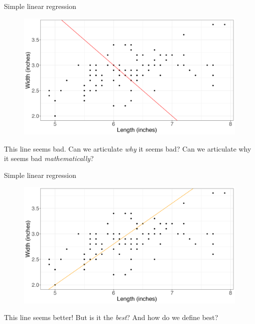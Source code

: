 \documentclass[10pt,t]{beamer}
\begin{document}
\begin{frame}{Simple linear regression}


\begin{figure}
	\centering \includegraphics[scale=0.35]{points2.png}
\end{figure}

\vspace{0.3cm}

This line seems bad. Can we articulate \textit{why} it seems bad? Can we articulate why it seems bad \textit{mathematically}?

\end{frame}

\begin{frame}{Simple linear regression}

\begin{figure}
	\centering \includegraphics[scale=0.35]{points3.png}
\end{figure}

\vspace{0.3cm}
\small This line seems better! But is it the \textit{best}? And how do we define best?

\end{frame}
\end{document}
